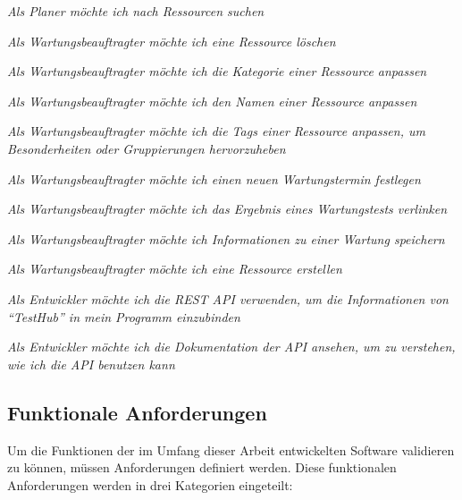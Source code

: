 \begin{description}
    \textit{Als Planer möchte ich nach Ressourcen suchen}

    \textit{Als Wartungsbeauftragter möchte ich eine Ressource löschen}

    \textit{Als Wartungsbeauftragter möchte ich die Kategorie einer Ressource anpassen}

    \textit{Als Wartungsbeauftragter möchte ich den Namen einer Ressource anpassen}

    \textit{Als Wartungsbeauftragter möchte ich die Tags einer Ressource anpassen,
    um Besonderheiten oder Gruppierungen hervorzuheben}

    \textit{Als Wartungsbeauftragter möchte ich einen neuen Wartungstermin festlegen}

    \textit{Als Wartungsbeauftragter möchte ich das Ergebnis eines Wartungstests verlinken}

    \textit{Als Wartungsbeauftragter möchte ich Informationen zu einer Wartung speichern}

    \textit{Als Wartungsbeauftragter möchte ich eine Ressource erstellen}

    \textit{Als Entwickler möchte ich die REST API verwenden, um die
    Informationen von ``TestHub'' in mein Programm einzubinden}

    \textit{Als Entwickler möchte ich die Dokumentation
    der \gls{API} ansehen, um zu verstehen, wie ich die \gls{API} benutzen kann}

\end{description}

\subsection{Funktionale Anforderungen}\label{sec:fas}
Um die Funktionen der im Umfang dieser Arbeit entwickelten Software validieren zu
können, müssen Anforderungen definiert werden. Diese funktionalen Anforderungen
werden in drei Kategorien eingeteilt:

